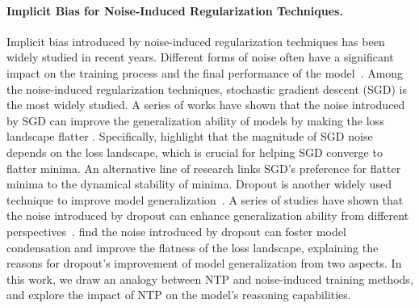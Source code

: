 
\paragraph{\textbf{Implicit Bias for Noise-Induced Regularization Techniques.}}
Implicit bias introduced by noise-induced regularization techniques has been widely studied in recent years. Different forms of noise often have a significant impact on the training process and the final performance of the model~\citep{zhu2019anisotropic}. Among the noise-induced regularization techniques, stochastic gradient descent (SGD) is the most widely studied. A series of works have shown that the noise introduced by SGD can improve the generalization ability of models by making the loss landscape flatter \citep{wu2020noisy,feng2021inverse,xie2020diffusion}. Specifically, \citep{mori2021power} highlight that the magnitude of SGD noise depends on the loss landscape, which is crucial for helping SGD converge to flatter minima. An alternative line of research \citep{wu2018sgd,ma2021linear} links SGD's preference for flatter minima to the dynamical stability of minima.
Dropout is another widely used technique to improve model generalization~\citep{dropdim, dropattention, drophead, li2023dropkey, demand_dropout, UniDrop, he2024matterstransformersattentionneeded}. A series of studies have shown that the noise introduced by dropout can enhance generalization ability from different perspectives~\citep{mianjy2018implicit, bank2020etf, lengerich2022dropout, cavazza2018dropout, wei2020implicit, zhang2023stochastic}. \citet{zhang2024implicit} find the noise introduced by dropout can foster model condensation and improve the flatness of the loss landscape, explaining the reasons for dropout’s improvement of model generalization from two aspects. In this work, we draw an analogy between NTP and noise-induced training methods, and explore the impact of NTP on the model's reasoning capabilities.